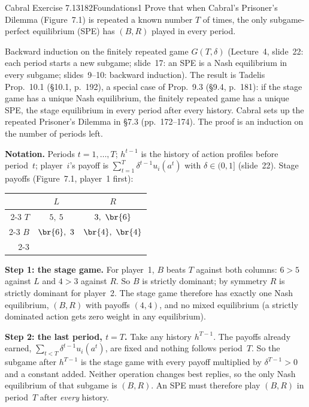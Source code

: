 \begin{exsol}{Cabral Exercise 7.13}{182}{Foundations}{1}
\asked Prove that when Cabral's Prisoner's Dilemma (Figure~7.1) is repeated a known number $T$ of
times, the only subgame-perfect equilibrium (SPE) has $(B,R)$ played in every period.

\method Backward induction on the finitely repeated game $G(T,\delta)$ (Lecture~4, slide~22: each
period starts a new subgame; slide~17: an SPE is a Nash equilibrium in every subgame; slides~9--10:
backward induction). The result is Tadelis Prop.~10.1 (\S10.1, p.~192), a special case of
Prop.~9.3 (\S9.4, p.~181): if the stage game has a unique Nash equilibrium, the finitely repeated
game has a unique SPE, the stage equilibrium in every period after every history. Cabral sets up
the repeated Prisoner's Dilemma in \S7.3 (pp.~172--174). The proof is an induction on the number of
periods left.

\solution
\textbf{Notation.} Periods $t = 1, \dots, T$; $h^{t-1}$ is the history of action profiles before
period~$t$; player~$i$'s payoff is $\sum_{t=1}^{T} \delta^{t-1} u_i(a^t)$ with $\delta \in (0,1]$
(slide~22). Stage payoffs (Figure~7.1, player~1 first):
\begin{center}
\begin{tabular}{r|c|c|}
\multicolumn{1}{r}{} & \multicolumn{1}{c}{$L$} & \multicolumn{1}{c}{$R$}\\ \cline{2-3}
$T$ & $5,\ 5$ & $3,\ \br{6}$ \\ \cline{2-3}
$B$ & $\br{6},\ 3$ & $\br{4},\ \br{4}$ \\ \cline{2-3}
\end{tabular}
\end{center}

\textbf{Step 1: the stage game.} For player~1, $B$ beats $T$ against both columns: $6 > 5$ against
$L$ and $4 > 3$ against $R$. So $B$ is strictly dominant; by symmetry $R$ is strictly dominant for
player~2. The stage game therefore has exactly one Nash equilibrium, $(B,R)$ with payoffs $(4,4)$,
and no mixed equilibrium (a strictly dominated action gets zero weight in any equilibrium).

\textbf{Step 2: the last period, $t = T$.} Take any history $h^{T-1}$. The payoffs already earned,
$\sum_{t<T}\delta^{t-1}u_i(a^t)$, are fixed and nothing follows period~$T$. So the subgame after
$h^{T-1}$ is the stage game with every payoff multiplied by $\delta^{T-1} > 0$ and a constant added.
Neither operation changes best replies, so the only Nash equilibrium of that subgame is $(B,R)$.
An SPE must therefore play $(B,R)$ in period~$T$ after \emph{every} history.


\end{exsol}
